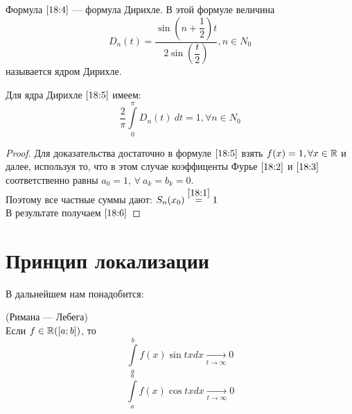 \documentclass[../../main.tex]{subfiles}
\begin{document}
\begin{rem}
	Формула $\eqref{18:4}$ --- формула Дирихле. В этой формуле величина
	\begin{equation}
		\label{18:5}
		D_n(t) = \dfrac{\sin(n+\dfrac{1}{2})t}{2\sin(\dfrac{t}{2})},
		n \in N_0 
	\end{equation}
	называется ядром Дирихле.
\end{rem}

\begin{crl*}
	Для ядра Дирихле $\eqref{18:5}$ имеем:
	\begin{equation}
		\label{18:6}
		\dfrac{2}{\pi}\int\limits_{0}^{\pi}{D_n(t)\ dt} = 1, \forall
		n \in N_0
	\end{equation}
\end{crl*}
\begin{proof}
	Для доказательства достаточно в формуле $\eqref{18:5}$ взять
	$f(x) = 1, \forall x \in \mathbb{R}$ и далее, используя то, что в этом
	случае коэффиценты Фурье $\eqref{18:2}$ и $\eqref{18:3}$
	соответственно равны $a_0 = 1$, $\forall\ a_k = b_k = 0$.\\
	Поэтому все частные суммы дают:
	$S_n(x_0) \stackrel{\eqref{18:1}}= 1$
	\\В результате получаем $\eqref{18:6}$
\end{proof}


\section{Принцип локализации}
В дальнейшем нам понадобится:
\begin{lemma}(Римана --- Лебега)\\
	Если $f \in \mathbb{R}([a; b])$, то \\
	\begin{equation}
		\label{18:7}
		\int\limits_{a}^{b}{f(x)\sin{tx}dx} \underset
		{t \rightarrow \infty}{\rightarrow} 0 
	\end{equation}
	\begin{equation}
	\label{18:8}
	\int\limits_{a}^{b}{f(x)\cos{tx}dx} \underset
	{t \rightarrow \infty}{\rightarrow} 0
	\end{equation}
\end{lemma}
\end{document}
